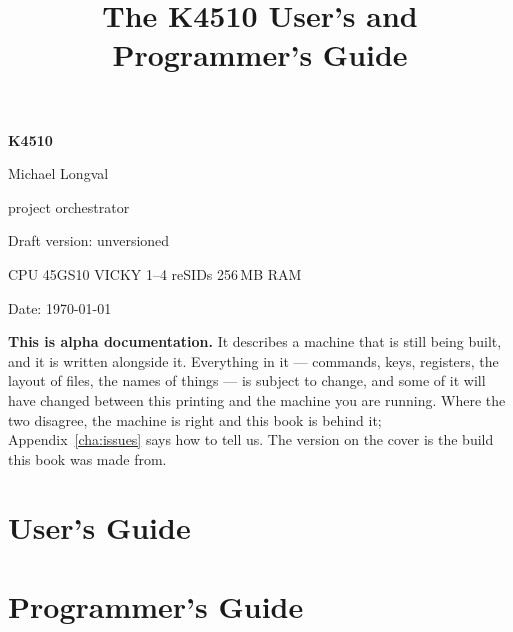 \documentclass[a5paper,11pt,openany]{book}
\title{The K4510 User's and Programmer's Guide}
\author{}\date{}
\newcommand{\guideversion}{unversioned}
\newcommand{\guidedate}{\today}
\begin{document}
\begin{titlepage}
\pagecolor{kblue}\color{kwhite}
\vspace*{2cm}\raggedleft
{\fontsize{40}{44}\selectfont\bfseries K4510\par}
\vspace{4mm}{\color{kyellow}\rule{\linewidth}{1.4pt}}
\vspace{6mm}{\Large USER'S AND PROGRAMMER'S GUIDE\par}
\vfill
{\normalsize Michael Longval\par}
{\small\color{kyellow} project orchestrator\par}
\vspace{6mm}
{\small\color{kyellow}
Draft version: \guideversion{}\par
\vspace{1mm}
CPU 45GS10 \textperiodcentered{} VICKY
\textperiodcentered{} 1--4 reSIDs \textperiodcentered{} 256\,MB RAM\par
\vspace{2mm}
Date: \guidedate\par}
\end{titlepage}
\nopagecolor
\thispagestyle{empty}
\vspace*{\fill}
\begin{aside}
\textbf{This is alpha documentation.} It describes a machine that is
still being built, and it is written alongside it. Everything in it ---
commands, keys, registers, the layout of files, the names of things ---
is subject to change, and some of it will have changed between this
printing and the machine you are running. Where the two disagree, the
machine is right and this book is behind it; Appendix~\ref{cha:issues}
says how to tell us. The version on the cover is the build this book
was made from.
\end{aside}
\vspace*{\fill}
\clearpage
\frontmatter
\tableofcontents
\mainmatter
\part{User's Guide}








\part{Programmer's Guide}


\appendix



\backmatter
\setcounter{secnumdepth}{0}  %



\end{document}
